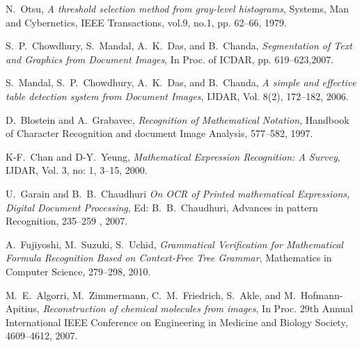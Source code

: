 \documentclass[conference]{IEEEtran}
\begin{document}
\begin{thebibliography}{1}

 N.~Otsu, \emph{A threshold selection method from gray-level histograms},
Systems, Man and Cybernetics, IEEE Transactions, vol.9, no.1, pp. 62--66, 1979.

S.~P.~Chowdhury, S.~Mandal, A.~K.~Das, and B.~Chanda, \emph{Segmentation
of Text and Graphics from Document Images},
In Proc. of ICDAR, pp. 619–623,2007.

S.~Mandal, S.~P.~Chowdhury, A.~K.~Das, and B.~Chanda,
\emph{A simple and effective table detection system from Document Images},
IJDAR, Vol. 8(2), 172–182, 2006.

D.~Blostein and A.~Grabavec,
\emph{Recognition of Mathematical Notation},
Handbook of Character Recognition and document Image Analysis,
577--582, 1997.
 
K-F.~Chan and D-Y.~Yeung,
\emph{Mathematical Expression Recognition: A Survey},
IJDAR, Vol. 3, no: 1, 3–15, 2000.

U.~Garain and B.~B.~Chaudhuri
\emph{On OCR of Printed mathematical Expressions, Digital Document Processing},
Ed: B.~B.~Chaudhuri, Advances in pattern Recognition, 235–259 , 2007.
 
A.~Fujiyoshi, M.~Suzuki, S.~Uchid,
 \emph{Grammatical Verification for Mathematical Formula Recognition Based on Context-Free Tree Grammar},
 Mathematics in Computer Science, 279--298, 2010.
 
 
 M.~E.~Algorri, M.~Zimmermann, C.~M.~Friedrich, S.~Akle, and M.~Hofmann-Apitius,
\emph{Reconstruction of chemical molecules from images},
In Proc. 29th Annual International IEEE Conference on Engineering in
Medicine and Biology Society, 4609--4612, 2007.


\end{thebibliography}
\end{document}
